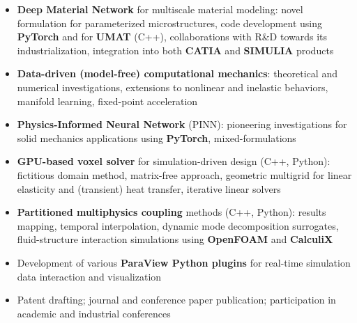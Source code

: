 \documentclass[10pt,a4paper,ragged2e,withhyper]{altacv}
\begin{document}
\begin{paracol}{2}

  \begin{itemize}
    \item \textbf{Deep Material Network} for multiscale material modeling: novel formulation for parameterized microstructures, code development using \textbf{PyTorch} and for \textbf{UMAT} (C++), collaborations with R\&D towards its industrialization, integration into both \textbf{CATIA} and \textbf{SIMULIA} products
    \item \textbf{Data-driven (model-free) computational mechanics}: theoretical and numerical investigations, extensions to nonlinear and inelastic behaviors, manifold learning, fixed-point acceleration
    \item \textbf{Physics-Informed Neural Network} (PINN): pioneering investigations for solid mechanics applications using \textbf{PyTorch}, mixed-formulations
    \item \textbf{GPU-based voxel solver} for simulation-driven design (C++, Python): fictitious domain method, matrix-free approach, geometric multigrid for linear elasticity and (transient) heat transfer, iterative linear solvers
    \item \textbf{Partitioned multiphysics coupling} methods (C++, Python): results mapping, temporal interpolation, dynamic mode decomposition surrogates, fluid-structure interaction simulations using \textbf{OpenFOAM} and \textbf{CalculiX}
    \item Development of various \textbf{ParaView Python plugins} for real-time simulation data interaction and visualization
    \item Patent drafting; journal and conference paper publication; participation in academic and industrial conferences
  \end{itemize}

  \divider


\end{paracol}
\end{document}
